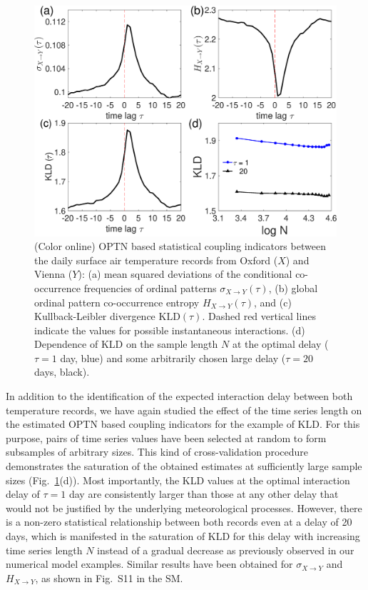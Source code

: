 \documentclass[12pt,aip,cha,reprint,nofootinbib]{revtex4-1}
\begin{document}
\begin{figure}
	\centering
	\includegraphics[width=\columnwidth]{E_temperature.eps}
\caption{(Color online) OPTN based statistical coupling indicators between the daily surface air temperature records from Oxford ($X$) and Vienna ($Y$): (a) mean squared deviations of the conditional co-occurrence frequencies of ordinal patterns $\sigma_{X\to Y} (\tau)$, (b) global ordinal pattern co-occurrence entropy $H_{X\to Y}(\tau)$, and (c) Kullback-Leibler divergence $\text{KLD}(\tau)$. Dashed red vertical lines indicate the values for possible instantaneous interactions. (d) Dependence of KLD on the sample length $N$ at the optimal delay ($\tau=1$ day, blue) and some arbitrarily chosen large delay ($\tau=20$ days, black). 
\label{fig:stdHeqTemp}}
\end{figure}

In addition to the identification of the expected interaction delay between both temperature records, we have again studied the effect of the time series length on the estimated OPTN based coupling indicators for the example of KLD. For this purpose, pairs of time series values have been selected at random to form subsamples of arbitrary sizes. This kind of cross-validation procedure demonstrates the saturation of the obtained estimates at sufficiently large sample sizes (Fig.~\ref{fig:stdHeqTemp}(d)). Most importantly, the KLD values at the optimal interaction delay of $\tau=1$ day are consistently larger than those at any other delay that would not be justified by the underlying meteorological processes. However, there is a non-zero statistical relationship between both records even at a delay of 20 days, which is manifested in the saturation of KLD for this delay with increasing time series length $N$ instead of a gradual decrease as previously observed in our numerical model examples. {\color{red}Similar results have been obtained for $\sigma_{X\to Y}$ and $H_{X\to Y}$, as shown in Fig.~S11 in the SM.}
\end{document}
